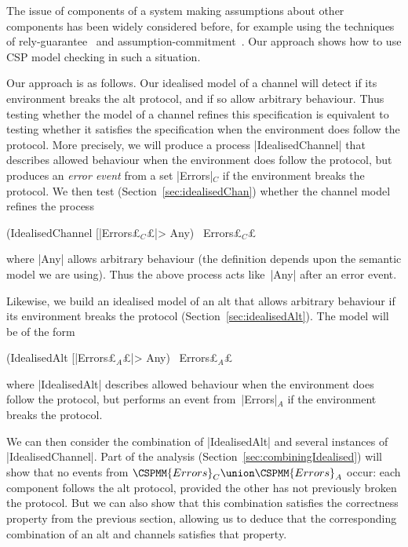 The issue of components of a system making assumptions about other components
has been widely considered before, for example using the techniques of
rely-guarantee~\cite{jones-83} and
assumption-commitment~\cite{misra-chandy-81,PJ-91}.  Our approach shows how to
use CSP model checking in such a situation. 


Our approach is as follows.  Our idealised model of a channel will detect if
its environment breaks the alt protocol, and if so allow arbitrary behaviour.
Thus testing whether the model of a channel refines this specification is
equivalent to testing whether it satisfies the specification when the
environment does follow the protocol.  More precisely, we will produce a
process |IdealisedChannel| that describes allowed behaviour when the
environment does follow the protocol, but produces an \emph{error event} from
a set |Errors|$_C$ if the environment breaks the protocol.  We then test
(Section~\ref{sec:idealisedChan}) whether the channel model refines the
process
%
\begin{cspm}
(IdealisedChannel [|Errors£$_C$£|> Any) \ Errors£$_C$£
\end{cspm}
%
where |Any| allows arbitrary behaviour (the definition depends upon the
semantic model we are using).  Thus the above process acts like~|Any| after an
error event. 

Likewise, we build an idealised model of an alt that allows arbitrary
behaviour if its environment breaks the protocol
(Section~\ref{sec:idealisedAlt}).  The model will be of the form
%
\begin{cspm}
(IdealisedAlt [|Errors£$_A$£|> Any) \ Errors£$_A$£
\end{cspm}
%
where |IdealisedAlt| describes allowed behaviour when the environment does
follow the protocol, but performs an event from~|Errors|$_A$ if the
environment breaks the protocol.

We can then consider the combination of |IdealisedAlt| and several instances
of |IdealisedChannel|.  Part of the analysis
(Section~\ref{sec:combiningIdealised}) will show that no events from
$\CSPMM{Errors}_C \union \CSPMM{Errors}_A$ occur: each component follows the
alt protocol, provided the other has not previously broken the protocol.  But
we can also show that this combination satisfies the correctness property from
the previous section, allowing us to deduce that the corresponding combination
of an alt and channels satisfies that property.

